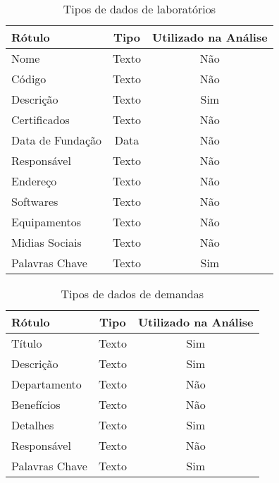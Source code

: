\begin{table}[H]
    \caption{Tipos de dados de laboratórios}
    \label{tab:dados_labs}
    \begin{tabular}{lcc}
        \hline
        \textbf{Rótulo}  & \textbf{Tipo} & \textbf{Utilizado na Análise} \\ \hline
        Nome             & Texto         & Não                           \\
        Código           & Texto         & Não                           \\
        Descrição        & Texto         & Sim                           \\
        Certificados     & Texto         & Não                           \\
        Data de Fundação & Data          & Não                           \\
        Responsável      & Texto         & Não                           \\
        Endereço         & Texto         & Não                           \\
        Softwares        & Texto         & Não                           \\
        Equipamentos     & Texto         & Não                           \\
        Midias Sociais   & Texto         & Não                           \\
        Palavras Chave   & Texto         & Sim                           \\ \hline
    \end{tabular}
    \fonte{}
\end{table}

\begin{table}[H]
    \caption{Tipos de dados de demandas}
    \label{tab:dados_demandas}
    \begin{tabular}{lcc}
        \hline
        \textbf{Rótulo} & \textbf{Tipo} & \textbf{Utilizado na Análise} \\ \hline
        Título          & Texto         & Sim                           \\
        Descrição       & Texto         & Sim                           \\
        Departamento    & Texto         & Não                           \\
        Benefícios      & Texto         & Não                           \\
        Detalhes        & Texto         & Sim                           \\
        Responsável     & Texto         & Não                           \\
        Palavras Chave  & Texto         & Sim                           \\ \hline
    \end{tabular}
    \fonte{}
\end{table}

